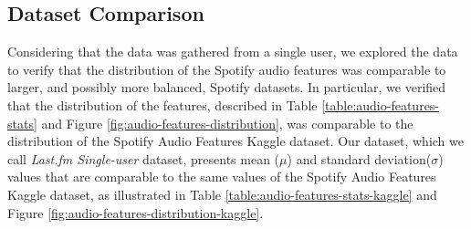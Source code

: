 \documentclass[sn-mathphys]{sn-jnl}%
\theoremstyle{thmstyleone}%
\theoremstyle{thmstyletwo}%
\theoremstyle{thmstylethree}%
\begin{document}
\subsection{Dataset Comparison}

Considering that the data was gathered from a single user,
we explored the data to verify that the distribution of the Spotify audio features
was comparable to larger, and possibly more balanced, Spotify datasets.
In particular, we verified that the distribution of the features,
described in Table \ref{table:audio-features-stats} and Figure \ref{fig:audio-features-distribution},
was comparable to the distribution of the Spotify Audio Features Kaggle dataset.
Our dataset, which we call \emph{Last.fm Single-user} dataset, presents mean ($\mu$) and standard deviation($\sigma$) values that are comparable to the same values of the Spotify Audio Features Kaggle dataset,
as illustrated in Table \ref{table:audio-features-stats-kaggle}
and Figure \ref{fig:audio-features-distribution-kaggle}.

\end{document}
